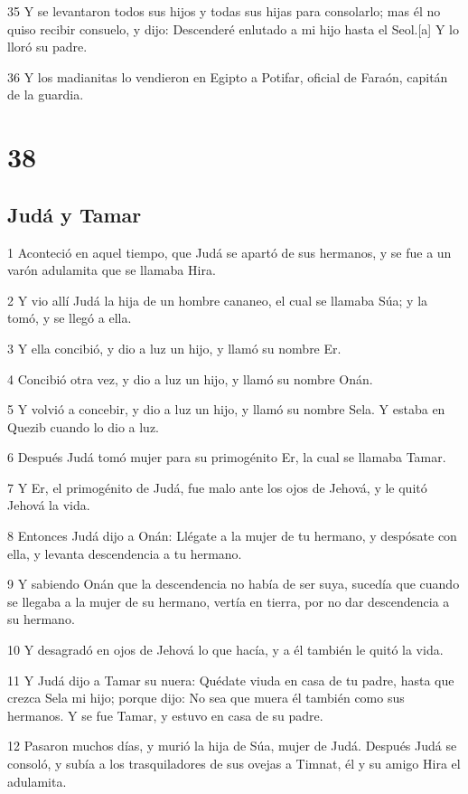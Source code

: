 35 Y se levantaron todos sus hijos y todas sus hijas para consolarlo; mas él no quiso recibir consuelo, y dijo: Descenderé enlutado a mi hijo hasta el Seol.[a] Y lo lloró su padre.

36 Y los madianitas lo vendieron en Egipto a Potifar, oficial de Faraón, capitán de la guardia.

\chapter{38}

\section{Judá y Tamar}

1 Aconteció en aquel tiempo, que Judá se apartó de sus hermanos, y se fue a un varón adulamita que se llamaba Hira.

2 Y vio allí Judá la hija de un hombre cananeo, el cual se llamaba Súa; y la tomó, y se llegó a ella.

3 Y ella concibió, y dio a luz un hijo, y llamó su nombre Er.

4 Concibió otra vez, y dio a luz un hijo, y llamó su nombre Onán.

5 Y volvió a concebir, y dio a luz un hijo, y llamó su nombre Sela. Y estaba en Quezib cuando lo dio a luz.

6 Después Judá tomó mujer para su primogénito Er, la cual se llamaba Tamar.

7 Y Er, el primogénito de Judá, fue malo ante los ojos de Jehová, y le quitó Jehová la vida.

8 Entonces Judá dijo a Onán: Llégate a la mujer de tu hermano, y despósate con ella, y levanta descendencia a tu hermano.

9 Y sabiendo Onán que la descendencia no había de ser suya, sucedía que cuando se llegaba a la mujer de su hermano, vertía en tierra, por no dar descendencia a su hermano.

10 Y desagradó en ojos de Jehová lo que hacía, y a él también le quitó la vida.

11 Y Judá dijo a Tamar su nuera: Quédate viuda en casa de tu padre, hasta que crezca Sela mi hijo; porque dijo: No sea que muera él también como sus hermanos. Y se fue Tamar, y estuvo en casa de su padre.

12 Pasaron muchos días, y murió la hija de Súa, mujer de Judá. Después Judá se consoló, y subía a los trasquiladores de sus ovejas a Timnat, él y su amigo Hira el adulamita.

